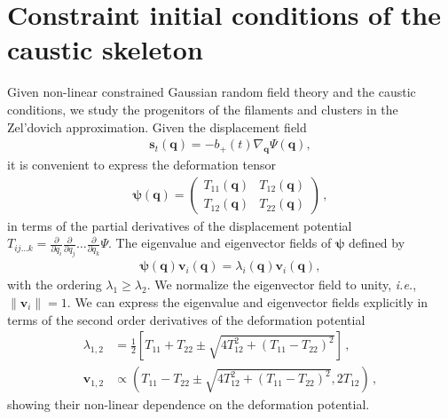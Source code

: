 \documentclass[a4paper, 11pt]{article}
\begin{document}
\section{Constraint initial conditions of the caustic skeleton}\label{sec:caustic_skeleton_constraints}
Given non-linear constrained Gaussian random field theory and the caustic conditions, we study the progenitors of the filaments and clusters in the Zel'dovich approximation. Given the displacement field 
\begin{align}
\bm{s}_t(\bm{q}) = -b_+(t) \nabla_{\bm{q}} \Psi(\bm{q}),
\end{align}
it is convenient to express the deformation tensor
\begin{align}
\bm{\psi}(\bm{q}) = \begin{pmatrix} T_{11}(\bm{q}) & T_{12}(\bm{q}) \\ T_{12}(\bm{q}) & T_{22}(\bm{q})\end{pmatrix}\,,
\end{align}
in terms of the partial derivatives of the displacement potential $T_{ij\dots k}=\frac{\partial}{\partial q_i}\frac{\partial}{\partial q_j}\dots \frac{\partial}{\partial q_k}\Psi$. The eigenvalue and eigenvector fields of $\bm{\psi}$ defined by
\begin{align}
\bm{\psi}(\bm{q}) \bm{v}_i(\bm{q}) = \lambda_i(\bm{q}) \bm{v}_i(\bm{q}),
\end{align}
with the ordering $\lambda_1\geq \lambda_2$. We normalize the eigenvector field to unity, \textit{i.e.}, $\|\bm{v}_{i}\|=1$. We can express the eigenvalue and eigenvector fields explicitly in terms of the second order derivatives of the deformation potential
\begin{align}
\lambda_{1,2} &= \frac{1}{2}\left[T_{11}+T_{22} \pm \sqrt{4 T_{12}^2+(T_{11}-T_{22})^2}\right]\,,\\
\bm{v}_{1,2} &\propto  \left(T_{11}-T_{22} \pm \sqrt{4 T_{12}^2+(T_{11}-T_{22})^2}, 2 T_{12}\right)\,,
\end{align}
showing their non-linear dependence on the deformation potential. 
\end{document}
